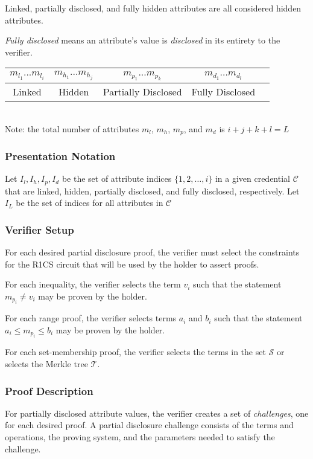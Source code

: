 \documentclass[a4paper]{article}
\begin{document}
Linked, partially disclosed, and fully hidden attributes are all considered hidden attributes.

\emph{Fully disclosed} means an attribute's value is \emph{disclosed} in its entirety to the verifier.

\begin{center}
    \begin{tabular}{|c|c|c|c|c|}
         \hline
         $m_{l_1} ... m_{l_i}$ & $m_{h_1} ... m_{h_j}$ & $m_{p_1} ... m_{p_k}$ & $m_{d_1} ... m_{d_l}$ \\
         \hline
         Linked & Hidden & Partially Disclosed & Fully Disclosed\\
         \hline 
    \end{tabular}\\
    Note: the total number of attributes $m_l$, $m_h$, $m_p$, and $m_d$ is $i + j + k + l = L$
\end{center}
\subsubsection{Presentation Notation}
Let $I_l, I_h, I_p, I_d$ be the set of attribute indices $\{1, 2, \ldots,i\}$ in a given credential $\mathcal{C}$ that are linked, hidden, partially disclosed, and fully disclosed, respectively. Let $I_L$ be the set of indices for all attributes in $\mathcal{C}$

\subsubsection{Verifier Setup}
For each desired partial disclosure proof, the verifier must select the constraints for the R1CS circuit that will be used by the holder to assert proofs.

For each inequality, the verifier selects the term $v_i$ such that the statement $m_{p_i} \neq v_i$ may be proven by the holder.

For each range proof, the verifier selects terms $a_i$ and $b_i$ such that the statement $a_i \leq m_{p_i} \leq b_i$ may be proven by the holder.

For each set-membership proof, the verifier selects the terms in the set $\mathcal{S}$ or selects the Merkle tree $\mathcal{T}$.


\subsubsection{Proof Description}
For partially disclosed attribute values, the verifier creates a set of \emph{challenges}, one for each desired proof. A partial disclosure challenge consists of the terms and operations, the proving system, and the parameters needed to satisfy the challenge.
\end{document}
